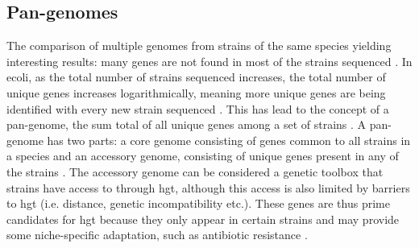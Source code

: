 \subsection{Pan-genomes}
The comparison of multiple genomes from strains of the same species yielding interesting results: many genes are not found in most of the strains sequenced \citep{toolpan}.
In \ac{ecoli}, as the total number of strains sequenced increases, the total number of unique genes increases logarithmically, meaning more unique genes are being identified with every new strain sequenced \citep{ecopan}.
This has lead to the concept of a pan-genome, the sum total of all unique genes among a set of strains \citep{pang}.
A pan-genome has two parts: a core genome consisting of genes common to all strains in a species and an accessory genome, consisting of unique genes present in any of the strains \citep{pang}.
The accessory genome can be considered a genetic toolbox that strains have access to through \ac{hgt}, although this access is also limited by barriers to \ac{hgt} (i.e. distance, genetic incompatibility etc.).
These genes are thus prime candidates for \ac{hgt} because they only appear in certain strains and may provide some niche-specific adaptation, such as antibiotic resistance \citep{pang}.
